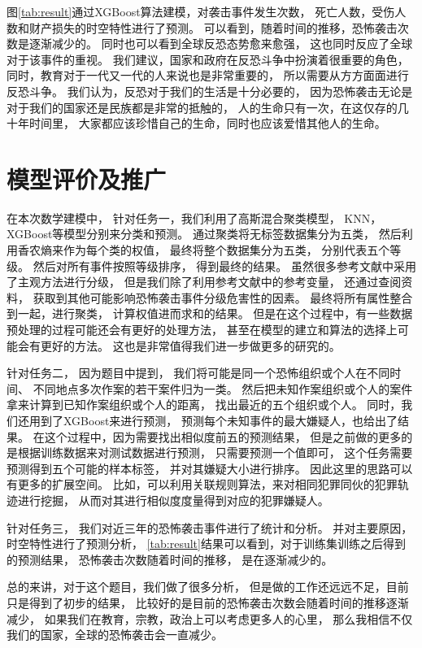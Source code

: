 \documentclass[bwprint]{gmcmthesis}
\begin{document}
图\ref{tab:result}通过XGBoost算法建模，对袭击事件发生次数，
死亡人数，受伤人数和财产损失的时空特性进行了预测。
可以看到，随着时间的推移，恐怖袭击次数是逐渐减少的。
同时也可以看到全球反恐态势愈来愈强，
这也同时反应了全球对于该事件的重视。
我们建议，国家和政府在反恐斗争中扮演着很重要的角色，
同时，教育对于一代又一代的人来说也是非常重要的，
所以需要从方方面面进行反恐斗争。
我们认为，反恐对于我们的生活是十分必要的，
因为恐怖袭击无论是对于我们的国家还是民族都是非常的抵触的，
人的生命只有一次，在这仅存的几十年时间里，
大家都应该珍惜自己的生命，同时也应该爱惜其他人的生命。


\section{模型评价及推广}

在本次数学建模中，
针对任务一，我们利用了高斯混合聚类模型，
KNN，XGBoost等模型分别来分类和预测。
通过聚类将无标签数据集分为五类，
然后利用香农熵来作为每个类的权值，
最终将整个数据集分为五类，
分别代表五个等级。
然后对所有事件按照等级排序，
得到最终的结果。
虽然很多参考文献中采用了主观方法进行分级，
但是我们除了利用参考文献中的参考变量，
还通过查阅资料，
获取到其他可能影响恐怖袭击事件分级危害性的因素。
最终将所有属性整合到一起，进行聚类，
计算权值进而求和的结果。
但是在这个过程中，有一些数据预处理的过程可能还会有更好的处理方法，
甚至在模型的建立和算法的选择上可能会有更好的方法。
这也是非常值得我们进一步做更多的研究的。

针对任务二，
因为题目中提到，
我们将可能是同一个恐怖组织或个人在不同时间、
不同地点多次作案的若干案件归为一类。
然后把未知作案组织或个人的案件拿来计算到已知作案组织或个人的距离，
找出最近的五个组织或个人。
同时，我们还用到了XGBoost来进行预测，
预测每个未知事件的最大嫌疑人，也给出了结果。
在这个过程中，因为需要找出相似度前五的预测结果，
但是之前做的更多的是根据训练数据来对测试数据进行预测，
只需要预测一个值即可，
这个任务需要预测得到五个可能的样本标签，
并对其嫌疑大小进行排序。
因此这里的思路可以有更多的扩展空间。
比如，可以利用关联规则算法，来对相同犯罪同伙的犯罪轨迹进行挖掘，
从而对其进行相似度度量得到对应的犯罪嫌疑人。

针对任务三，
我们对近三年的恐怖袭击事件进行了统计和分析。
并对主要原因，时空特性进行了预测分析，
\ref{tab:result}结果可以看到，对于训练集训练之后得到的预测结果，
恐怖袭击次数随着时间的推移，
是在逐渐减少的。

总的来讲，对于这个题目，我们做了很多分析，
但是做的工作还远远不足，目前只是得到了初步的结果，
比较好的是目前的恐怖袭击次数会随着时间的推移逐渐减少，
如果我们在教育，宗教，政治上可以考虑更多人的心里，
那么我相信不仅我们的国家，全球的恐怖袭击会一直减少。
\end{document}
